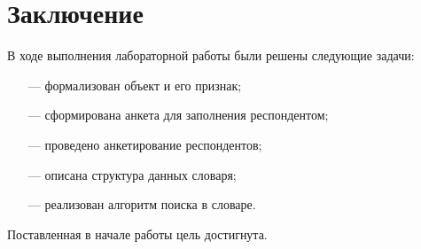 \chapter*{Заключение}

В ходе выполнения лабораторной работы были решены следующие задачи:

\begin{enumerate}
	\item[---] формализован объект и его признак;
	\item[---] сформирована анкета для заполнения респондентом;
	\item[---] проведено анкетирование респондентов;
	\item[---] описана структура данных словаря;
	\item[---] реализован алгоритм поиска в словаре.
\end{enumerate}

Поставленная в начале работы цель достигнута.